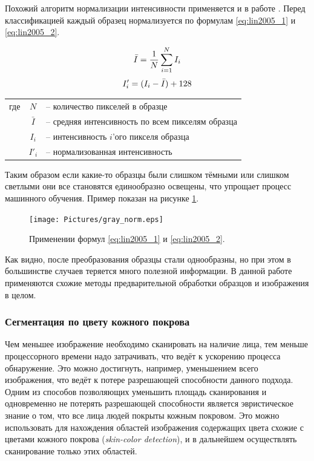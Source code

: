 \documentclass[12pt]{report}
\begin{document}
Похожий алгоритм нормализации интенсивности применяется и в работе \citep{lin2005face}. Перед классификацией каждый 
образец нормализуется по формулам \ref{eq:lin2005_1} и \ref{eq:lin2005_2}.

\begin{equation}
\label{eq:lin2005_1}
\centering
\bar{I}=\frac{1}{N}\sum_{i=1}^{N}I_{i}
\end{equation}
\begin{equation}
\label{eq:lin2005_2}
\centering
{I}'_i=(I_i-\bar{I})+128
\end{equation}

\begin{tabular}{p{3cm} c l}
где & $N$ & -- количество пикселей в образце\\
	& $\bar{I}$ & -- средняя интенсивность по всем пикселям образца\\
	& $I_i$ & -- интенсивность $i$'ого пикселя образца\\
	& ${I}'_i$ & -- нормализованная интенсивность\\
\end{tabular}

Таким образом если какие-то образцы были слишком тёмными или слишком светлыми они все становятся единообразно 
освещены, что упрощает процесс машинного обучения. Пример показан на рисунке \ref{fig:gray_norm}.

\begin{figure}[h]
	\centering
	\texttt{[image: Pictures/gray\_norm.eps]}
	\caption{Применении формул \ref{eq:lin2005_1} и \ref{eq:lin2005_2}.}
	\label{fig:gray_norm}
\end{figure}

Как видно, после преобразования образцы стали однообразны, но при этом в большинстве случаев теряется много 
полезной 
информации. В данной работе применяются схожие методы предварительной обработки образцов и изображения в целом. 

\subsubsection{Сегментация по цвету кожного покрова}
\label{sec:skin_segm}
Чем меньшее изображение необходимо сканировать на наличие лица, тем меньше процессорного времени надо 
затрачивать, что ведёт к ускорению процесса обнаружение. Это можно достигнуть, например, уменьшением всего 
изображения, что 
ведёт к потере разрешающей способности данного подхода. Одним из способов позволяющих уменьшить площадь 
сканирования и одновременно не потерять разрешающей способности является эвристическое знание о том, что все лица 
людей покрыты кожным покровом. Это можно использовать для нахождения областей изображения содержащих цвета схожие с 
цветами кожного покрова (\textit{skin-color detection}), и в дальнейшем осуществлять сканирование только этих 
областей.
\end{document}
